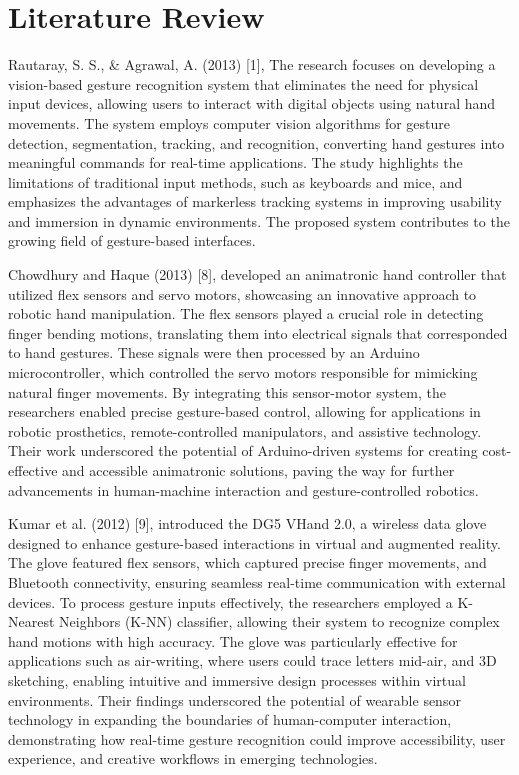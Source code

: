 \section{Literature Review}

Rautaray, S. S., \& Agrawal, A. (2013) [1], The research focuses on developing a vision-based gesture recognition system that eliminates the need for physical input devices, allowing users to interact with digital objects using natural hand movements. The system employs computer vision algorithms for gesture detection, segmentation, tracking, and recognition, converting hand gestures into meaningful commands for real-time applications. The study highlights the limitations of traditional input methods, such as keyboards and mice, and emphasizes the advantages of markerless tracking systems in improving usability and immersion in dynamic environments. The proposed system contributes to the growing field of gesture-based interfaces.

Chowdhury and Haque (2013) [8], developed an animatronic hand controller that utilized flex sensors and servo motors, showcasing an innovative approach to robotic hand manipulation. The flex sensors played a crucial role in detecting finger bending motions, translating them into electrical signals that corresponded to hand gestures. These signals were then processed by an Arduino microcontroller, which controlled the servo motors responsible for mimicking natural finger movements. By integrating this sensor-motor system, the researchers enabled precise gesture-based control, allowing for applications in robotic prosthetics, remote-controlled manipulators, and assistive technology. Their work underscored the potential of Arduino-driven systems for creating cost-effective and accessible animatronic solutions, paving the way for further advancements in human-machine interaction and gesture-controlled robotics.

Kumar et al. (2012) [9], introduced the DG5 VHand 2.0, a wireless data glove designed to enhance gesture-based interactions in virtual and augmented reality. The glove featured flex sensors, which captured precise finger movements, and Bluetooth connectivity, ensuring seamless real-time communication with external devices. To process gesture inputs effectively, the researchers employed a K-Nearest Neighbors (K-NN) classifier, allowing their system to recognize complex hand motions with high accuracy. The glove was particularly effective for applications such as air-writing, where users could trace letters mid-air, and 3D sketching, enabling intuitive and immersive design processes within virtual environments. Their findings underscored the potential of wearable sensor technology in expanding the boundaries of human-computer interaction, demonstrating how real-time gesture recognition could improve accessibility, user experience, and creative workflows in emerging technologies.

